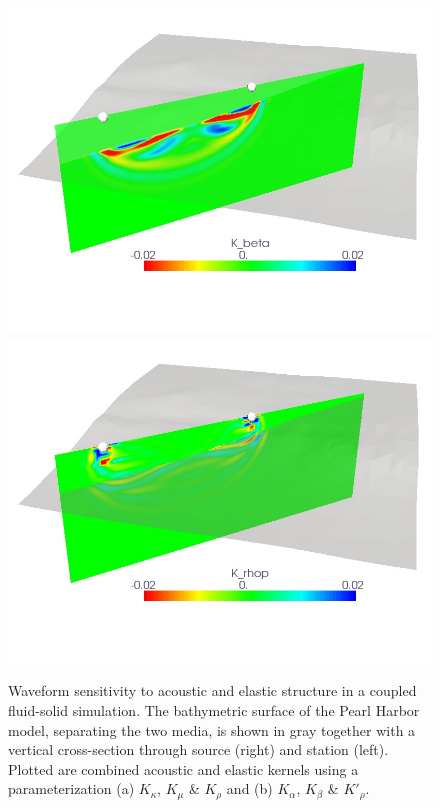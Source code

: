 \documentclass[referee,extra]{gji}
\begin{document}
\begin{figure}
\begin{center}
\begin{minipage}[t]{0.49\textwidth}
\begin{center}
\includegraphics[width=1.\textwidth]{./images/pearl_beta_kernel.jpg}\\
\includegraphics[width=1.\textwidth]{./images/pearl_rhop_kernel.jpg}
\end{center}
\end{minipage}
\end{center}
\caption{Waveform sensitivity to acoustic and elastic structure in a coupled fluid-solid simulation.
The bathymetric surface of the Pearl Harbor model, separating the two media, is shown in gray
together with a vertical cross-section through source (right) and station (left).
Plotted are combined acoustic and elastic kernels using a parameterization (a) $K_\kappa $, $K_\mu$ \& $K_\rho$
and (b) $K_\alpha$, $K_\beta$ \& $K'_{\rho}$.   }
\label{figure:kernelwater}
\end{figure}
\end{document}
